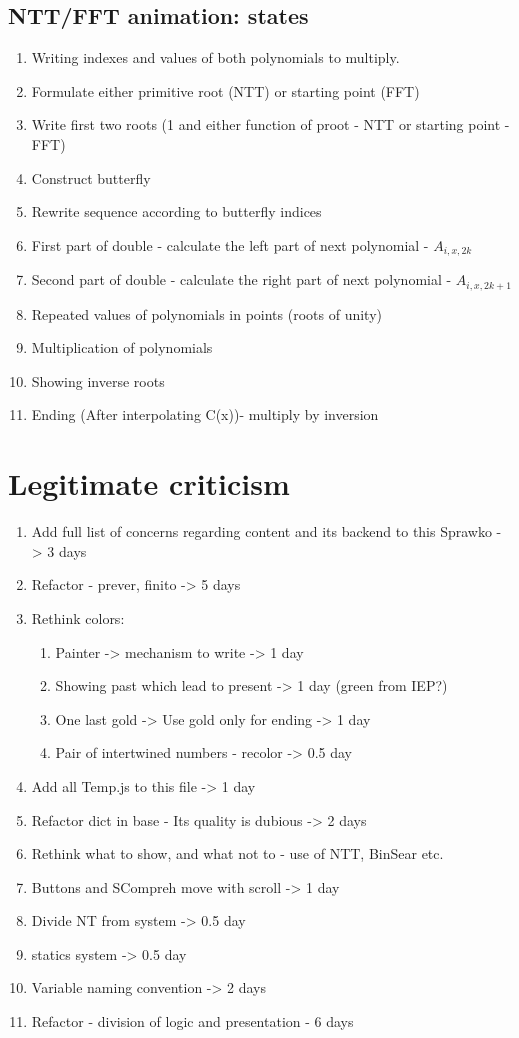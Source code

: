 \documentclass[12pt]{article}
\begin{document}
\subsection{NTT/FFT animation: states}
\begin {enumerate}
	\item Writing indexes and values of both polynomials to multiply.
	\item Formulate either primitive root (NTT) or starting point (FFT)
	\item Write first two roots (1 and either function of proot - NTT or starting point - FFT)
	\item Construct butterfly
	\item Rewrite sequence according to butterfly indices
	\item First part of double - calculate the left part of next polynomial - \(A_{i,x,2k}\)
	\item Second part of double - calculate the right part of next polynomial - \(A_{i,x,2k+1}\)
	\item Repeated values of polynomials in points (roots of unity)
	\item Multiplication of polynomials
	\item Showing inverse roots
	\item Ending (After interpolating C(x))- multiply by inversion
\end {enumerate}

\section{Legitimate criticism}
\begin {enumerate}
	\item Add full list of concerns regarding content and its backend to this Sprawko -> 3 days
	\item Refactor - prever, finito -> 5 days
	\item Rethink colors:
	\begin{enumerate}
		\item Painter -> mechanism to write -> 1 day
		\item Showing past which lead to present -> 1 day (green from IEP?)
		\item One last gold -> Use gold only for ending -> 1 day
		\item Pair of intertwined numbers - recolor -> 0.5 day
	\end{enumerate}
	\item Add all Temp.js to this file -> 1 day
	\item Refactor dict in base - Its quality is dubious -> 2 days
	\item Rethink what to show, and what not to - use of NTT, BinSear etc.
	\item Buttons and SCompreh move with scroll -> 1 day
	\item Divide NT from system -> 0.5 day
	\item statics system -> 0.5 day
	\item Variable naming convention -> 2 days
	\item Refactor - division of logic and presentation - 6 days
\end{enumerate}
\end{document}
